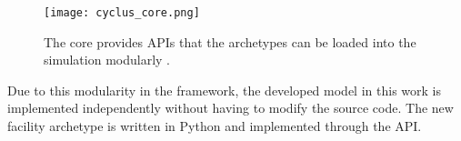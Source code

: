\begin{figure}[htbp!]
    \begin{center}
        \texttt{[image: cyclus\_core.png]}
    \end{center}
    \caption{The \Cyclus core provides APIs that the archetypes
            can be loaded into the simulation modularly
            \cite{huff_fundamental_2016}.}
    \label{fig:core}
\end{figure}

Due to this modularity in the \Cyclus framework, the developed
model in this work is implemented independently without
having to modify the \Cyclus source code. The new facility archetype
is written in Python and implemented through the \Cyclus API.
